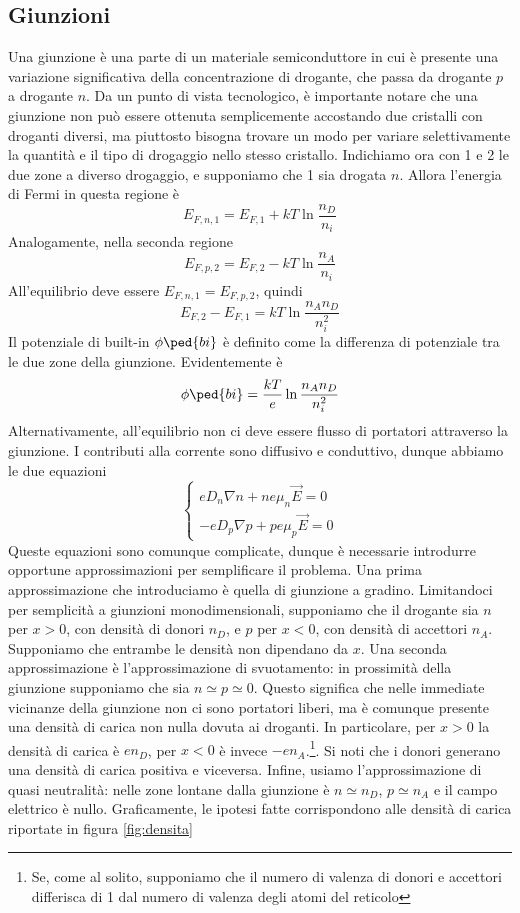 \documentclass[a4paper, 11pt]{article}
\begin{document}
	\subsection{Giunzioni}
	Una giunzione è una parte di un materiale semiconduttore in cui è presente una variazione significativa della concentrazione di drogante, che passa da drogante $p$ a drogante $n$. Da un punto di vista tecnologico, è importante notare che una giunzione non può essere ottenuta semplicemente accostando due cristalli con droganti diversi, ma piuttosto bisogna trovare un modo per variare selettivamente la quantità e il tipo di drogaggio nello stesso cristallo. Indichiamo ora con 1 e 2 le due zone a diverso drogaggio, e supponiamo che 1 sia drogata $n$. Allora l'energia di Fermi in questa regione è
	\[E_{F,n,1}=E_{F,1}+kT\ln\frac{n_D}{n_i}\]
	Analogamente, nella seconda regione
	\[E_{F,p,2}=E_{F,2}-kT\ln\frac{n_A}{n_i}\]
	All'equilibrio deve essere $E_{F,n,1}=E_{F,p,2}$, quindi
	\[E_{F,2}-E_{F,1}=kT\ln\frac{n_An_D}{n_i^2}\]
	Il potenziale di built-in $\phi\ped{bi}$ è definito come la differenza di potenziale tra le due zone della giunzione. Evidentemente è
	\[\phi\ped{bi}=\frac{kT}{e}\ln\frac{n_An_D}{n_i^2}\]
	Alternativamente, all'equilibrio non ci deve essere flusso di portatori attraverso la giunzione. I contributi alla corrente sono diffusivo e conduttivo, dunque abbiamo le due equazioni
	\[\begin{cases}eD_n\nabla n+ne\mu_n\vec{E}=0\\
	-eD_p\nabla p+pe\mu_p\vec{E}=0
	\end{cases}\]
	Queste equazioni sono comunque complicate, dunque è necessarie introdurre opportune approssimazioni per semplificare il problema. Una prima approssimazione che introduciamo è quella di giunzione a gradino. Limitandoci per semplicità a giunzioni monodimensionali, supponiamo che il drogante sia $n$ per $x>0$, con densità di donori $n_D$, e $p$ per $x<0$, con densità di accettori $n_A$. Supponiamo che entrambe le densità non dipendano da $x$. Una seconda approssimazione è l'approssimazione di svuotamento: in prossimità della giunzione supponiamo che sia $n\simeq p\simeq 0$. Questo significa che nelle immediate vicinanze della giunzione non ci sono portatori liberi, ma è comunque presente una densità di carica non nulla dovuta ai droganti. In particolare, per $x>0$ la densità di carica è $en_D$, per $x<0$ è invece $-en_A$.\footnote{Se, come al solito, supponiamo che il numero di valenza di donori e accettori differisca di 1 dal numero di valenza degli atomi del reticolo}. Si noti che i donori generano una densità di carica positiva e viceversa. Infine, usiamo l'approssimazione di quasi neutralità: nelle zone lontane dalla giunzione è $n\simeq n_D$, $p\simeq n_A$ e il campo elettrico è nullo. Graficamente, le ipotesi fatte corrispondono alle densità di carica riportate in figura \ref{fig:densita}
\end{document}
